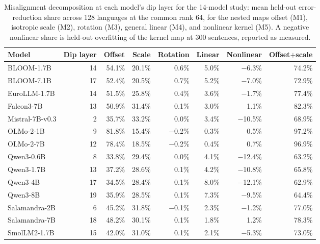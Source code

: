 \documentclass{article} %
\begin{document}
\begin{table}[h]
\caption{Misalignment decomposition at each model's dip layer for the 14-model study: mean held-out error-reduction share across 128 languages at the common rank 64, for the nested maps offset (M1), isotropic scale (M2), rotation (M3), general linear (M4), and nonlinear kernel (M5). A negative nonlinear share is held-out overfitting of the kernel map at 300 sentences, reported as measured.}
\label{tab:budget_models}
\begin{center}\small
\begin{tabular}{lrrrrrrr}
\toprule
Model & Dip layer & Offset & Scale & Rotation & Linear & Nonlinear & Offset$+$scale \\
\midrule
BLOOM-1.7B & 14 & 54.1\% & 20.1\% & 0.6\% & 5.0\% & $-$6.3\% & 74.2\% \\
BLOOM-7.1B & 17 & 52.4\% & 20.5\% & 0.7\% & 5.2\% & $-$7.0\% & 72.9\% \\
EuroLLM-1.7B & 14 & 51.5\% & 25.8\% & 0.4\% & 3.6\% & $-$1.7\% & 77.4\% \\
Falcon3-7B & 13 & 50.9\% & 31.4\% & 0.1\% & 3.0\% & 1.1\% & 82.3\% \\
Mistral-7B-v0.3 & 2 & 35.7\% & 33.2\% & 0.0\% & 3.4\% & $-$10.5\% & 68.9\% \\
OLMo-2-1B & 9 & 81.8\% & 15.4\% & $-$0.2\% & 0.3\% & 0.5\% & 97.2\% \\
OLMo-2-7B & 12 & 78.4\% & 18.5\% & $-$0.2\% & 0.4\% & 0.7\% & 96.9\% \\
Qwen3-0.6B & 8 & 33.8\% & 29.4\% & 0.0\% & 4.1\% & $-$12.4\% & 63.2\% \\
Qwen3-1.7B & 13 & 37.2\% & 28.6\% & 0.1\% & 4.2\% & $-$10.8\% & 65.8\% \\
Qwen3-4B & 17 & 34.5\% & 28.4\% & 0.1\% & 8.0\% & $-$12.1\% & 62.9\% \\
Qwen3-8B & 19 & 35.9\% & 28.5\% & 0.1\% & 7.3\% & $-$9.5\% & 64.4\% \\
Salamandra-2B & 6 & 45.2\% & 31.8\% & $-$0.1\% & 2.3\% & $-$1.2\% & 77.0\% \\
Salamandra-7B & 18 & 48.2\% & 30.1\% & 0.1\% & 1.8\% & 1.2\% & 78.3\% \\
SmolLM2-1.7B & 15 & 42.0\% & 31.0\% & 0.1\% & 2.1\% & $-$5.3\% & 73.0\% \\
\bottomrule
\end{tabular}
\end{center}
\end{table}
\end{document}
